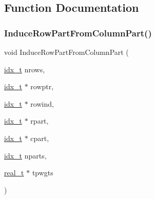 \subsection{Function Documentation}
\mbox{\label{a00236_ae1253bac89c47d556436695e62bcfacd}} 
\subsubsection{\texorpdfstring{Induce\+Row\+Part\+From\+Column\+Part()}{InduceRowPartFromColumnPart()}}
{\footnotesize\ttfamily void Induce\+Row\+Part\+From\+Column\+Part (\begin{DoxyParamCaption}\item[{\hyperlink{a00876_aaa5262be3e700770163401acb0150f52}{idx\+\_\+t}}]{nrows,  }\item[{\hyperlink{a00876_aaa5262be3e700770163401acb0150f52}{idx\+\_\+t} $\ast$}]{rowptr,  }\item[{\hyperlink{a00876_aaa5262be3e700770163401acb0150f52}{idx\+\_\+t} $\ast$}]{rowind,  }\item[{\hyperlink{a00876_aaa5262be3e700770163401acb0150f52}{idx\+\_\+t} $\ast$}]{rpart,  }\item[{\hyperlink{a00876_aaa5262be3e700770163401acb0150f52}{idx\+\_\+t} $\ast$}]{cpart,  }\item[{\hyperlink{a00876_aaa5262be3e700770163401acb0150f52}{idx\+\_\+t}}]{nparts,  }\item[{\hyperlink{a00876_a1924a4f6907cc3833213aba1f07fcbe9}{real\+\_\+t} $\ast$}]{tpwgts }\end{DoxyParamCaption})}

